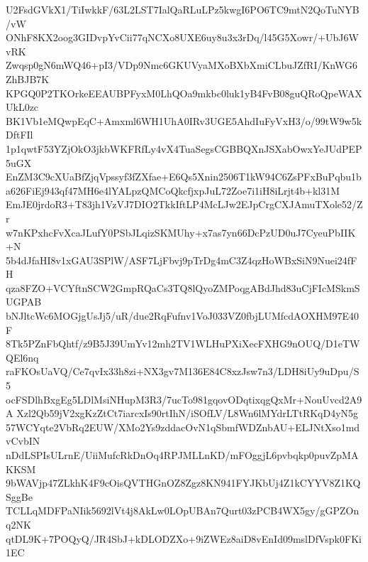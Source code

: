 U2FsdGVkX1/TiIwkkF/63L2LST7IalQaRLuLPz5kwgI6PO6TC9mtN2QoTuNYB/vW
ONhF8KX2oog3GIDvpYvCii77qNCXo8UXE6uy8u3x3rDq/l45G5Xowr/+UbJ6WvRK
Zwqsp0gN6mWQ46+pI3/VDp9Nmc6GKUVyaMXoBXbXmiCLbuJZfRI/KnWG6ZhBJB7K
KPGQ0P2TKOrkeEEAUBPFyxM0LhQOa9mkbc0luk1yB4FvB08guQRoQpeWAXUkL0zc
BK1Vb1eMQwpEqC+Amxml6WH1UhA0IRv3UGE5AhdIuFyVxH3/o/99tW9w5kDftFIl
1p1qwtF53YZjOkO3jkbWKFRfLy4vX4TuaSegsCGBBQXnJSXabOwxYeJUdPEP5uGX
EnZM3C9cXUaBfZjqVpssyf3fZXfae+E6Qs5Xnin2506T1kW94C6ZsPFxBuPqbu1b
a626FiEj943qf47MH6e4lYALpzQMCoQkcfjxpJuL72Zoe7i1iH8iLrjt4b+kl31M
EmJE0jrdoR3+T83jh1VzVJ7DIO2TkkIftLP4McLJw2EJpCrgCXJAmuTXole52/Zr
w7nKPxhcFvXcaJLufY0PSbJLqizSKMUhy+x7as7yn66DcPzUD0uJ7CyeuPbIIK+N
5b4dJfaHI8v1xGAU3SPlW/ASF7LjFbvj9pTrDg4mC3Z4qzHoWBxSiN9Nuei24fFH
qza8FZO+VCYftnSCW2GmpRQaCs3TQ8lQyoZMPoqgABdJhd83uCjFIcMSkmSUGPAB
bNJltcWc6MOGjgUsJj5/uR/due2RqFufnv1VoJ033VZ0fbjLUMfcdAOXHM97E40F
8Tk5PZnFbQhtf/z9B5J39UmYv12mh2TV1WLHuPXiXecFXHG9nOUQ/D1eTWQEl6nq
raFKOsUaVQ/Ce7qvIx33h8zi+NX3gv7M136E84C8xzJsw7n3/LDH8iUy9uDpu/S5
ocFSDlhBxgEg5LDlMsiNHupM3R3/7ucTo981gqovODqtixqgQxMr+NouUvcd2A9A
Xzl2Qb59jV2xgKzZtCt7iarcxIs90rtIhN/iSOfLV/L8Wn6lMYdrLTtRKqD4yN5g
57WCYqte2VbRq2EUW/XMo2Ys9zddacOvN1qSbmfWDZnbAU+ELJNtXso1mdvCvbIN
nDdLSPIsULrnE/UiiMufcRkDnOq4RPJMLLnKD/mFOggjL6pvbqkp0puvZpMAKKSM
9bWAVjp47ZLkhK4F9cOisQVTHGnOZ8Zgz8KN941FYJKbUj4Z1kCYYV8Z1KQSggBe
TCLLqMDFPaNIik5692lVt4j8AkLw0LOpUBAn7Qurt03zPCB4WX5gy/gGPZOnq2NK
qtDL9K+7POQyQ/JR4SbJ+kDLODZXo+9iZWEz8aiD8vEnId09mslDfVspk0FKi1EC
